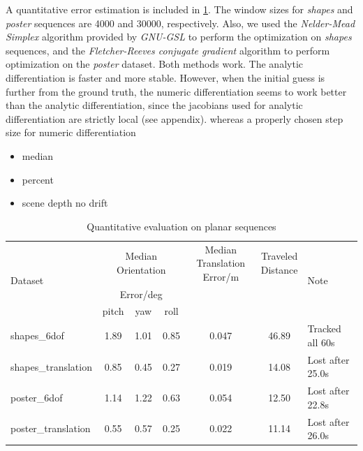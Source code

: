 A quantitative error estimation is included in \cref{tab:err_est}. The
window sizes for \textit{shapes} and \textit{poster} sequences are
4000 and 30000, respectively. Also, we used the \textit{Nelder-Mead
  Simplex} algorithm provided by \textit{GNU-GSL}\citep{gough2009gnu}
to perform the optimization on \textit{shapes} sequences, and the
\textit{Fletcher-Reeves conjugate
  gradient}\citep{fletcher2013practical} algorithm to perform
optimization on the \textit{poster} dataset. Both methods work. The
analytic differentiation is faster and more stable. However, when the
initial guess is further from the ground truth, the numeric
differentiation seems to work better than the analytic
differentiation, since the jacobians used for analytic differentiation
are strictly local (see appendix). whereas a properly chosen step size
for numeric differentiation
\begin{itemize}
\item median\\
\item percent\\
\item scene depth no drift\\
\end{itemize}

\begin{table}[h]
  \label{tab:err_est}
  \begin{center}
    \begin{tabular}{lcccccl}
      \hline
      \multirow{3}{*}{Dataset}&\multicolumn{3}{c}{Median Orientation}&\multirowcell{3}{Median Translation \\ Error/m}&\multirowcell{3}{Traveled\\Distance}&\multirow{3}{*}{Note}\\
                              &\multicolumn{3}{c}{Error/deg}& &\\
      \cline{2-4}
                              & pitch&  yaw & roll &       &       &                  \\
      \hline
      shapes\_6dof        & 1.89 & 1.01 & 0.85 & 0.047 & 46.89 & Tracked all 60s  \\
      shapes\_translation & 0.85 & 0.45 & 0.27 & 0.019 & 14.08 & Lost after 25.0s \\
      poster\_6dof        & 1.14 & 1.22 & 0.63 & 0.054 & 12.50 & Lost after 22.8s \\
      poster\_translation & 0.55 & 0.57 & 0.25 & 0.022 & 11.14 & Lost after 26.0s \\
      \hline
    \end{tabular}
  \end{center}
  \caption{Quantitative evaluation on planar sequences}
\end{table}


